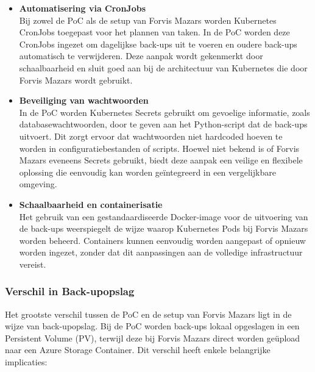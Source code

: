 \begin{itemize}
    \item \textbf{Automatisering via CronJobs} \\
    Bij zowel de PoC als de setup van Forvis Mazars worden Kubernetes CronJobs toegepast voor het plannen van taken. In de PoC worden deze CronJobs ingezet om dagelijkse back-ups uit te voeren en oudere back-ups automatisch te verwijderen. Deze aanpak wordt gekenmerkt door schaalbaarheid en sluit goed aan bij de architectuur van Kubernetes die door Forvis Mazars wordt gebruikt.
    
    \item \textbf{Beveiliging van wachtwoorden} \\
    In de PoC worden Kubernetes Secrets gebruikt om gevoelige informatie, zoals databasewachtwoorden, door te geven aan het Python-script dat de back-ups uitvoert. Dit zorgt ervoor dat wachtwoorden niet hardcoded hoeven te worden in configuratiebestanden of scripts. Hoewel niet bekend is of Forvis Mazars eveneens Secrets gebruikt, biedt deze aanpak een veilige en flexibele oplossing die eenvoudig kan worden geïntegreerd in een vergelijkbare omgeving.
    
    \item \textbf{Schaalbaarheid en containerisatie} \\
    Het gebruik van een gestandaardiseerde Docker-image voor de uitvoering van de back-ups weerspiegelt de wijze waarop Kubernetes Pods bij Forvis Mazars worden beheerd. Containers kunnen eenvoudig worden aangepast of opnieuw worden ingezet, zonder dat dit aanpassingen aan de volledige infrastructuur vereist.
\end{itemize}


\subsubsection*{Verschil in Back-upopslag}

Het grootste verschil tussen de PoC en de setup van Forvis Mazars ligt in de wijze van back-upopslag. Bij de PoC worden back-ups lokaal opgeslagen in een Persistent Volume (PV), terwijl deze bij Forvis Mazars direct worden geüpload naar een Azure Storage Container. Dit verschil heeft enkele belangrijke implicaties:

